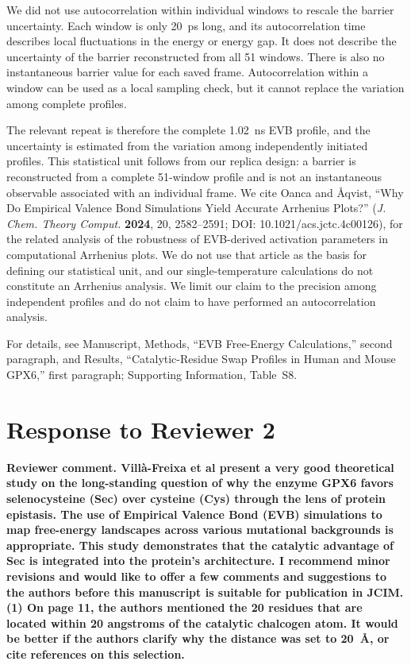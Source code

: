 \documentclass[11pt]{article}
\newcommand{\ReviewerComment}[1]{\par\noindent\textbf{Reviewer comment. #1}\par}
\newcommand{\Location}[1]{\par\noindent For details, see #1\par}
\begin{document}
We did not use autocorrelation within individual windows to rescale the barrier
uncertainty. Each window is only 20~ps long, and its autocorrelation time describes local
fluctuations in the energy or energy gap. It does not describe the uncertainty of the
barrier reconstructed from all 51 windows. There is also no instantaneous barrier value
for each saved frame. Autocorrelation within a window can be used as a local sampling
check, but it cannot replace the variation among complete profiles.

The relevant repeat is therefore the complete 1.02~ns EVB profile, and the uncertainty is
estimated from the variation among independently initiated profiles. This statistical unit
follows from our replica design: a barrier is reconstructed from a complete 51-window
profile and is not an instantaneous observable associated with an individual frame. We
cite Oanca and {\AA}qvist, ``Why Do Empirical Valence Bond Simulations Yield Accurate
Arrhenius Plots?'' (\textit{J. Chem. Theory Comput.} \textbf{2024}, 20, 2582--2591;
DOI: 10.1021/acs.jctc.4c00126), for the related analysis of the robustness of EVB-derived
activation parameters in computational Arrhenius plots. We do not use that article as the
basis for defining our statistical unit, and our single-temperature calculations do not
constitute an Arrhenius analysis. We limit our claim to the precision among independent
profiles and do not claim to have performed an autocorrelation analysis.

\Location{Manuscript, Methods, ``EVB Free-Energy Calculations,'' second paragraph, and
Results, ``Catalytic-Residue Swap Profiles in Human and Mouse GPX6,'' first paragraph;
Supporting Information, Table~S8.}

\newpage
\section*{Response to Reviewer 2}

\ReviewerComment{Vill\`a-Freixa et al present a very good theoretical study on the long-standing question of why the enzyme GPX6 favors selenocysteine (Sec) over cysteine (Cys) through the lens of protein epistasis. The use of Empirical Valence Bond (EVB) simulations to map free-energy landscapes across various mutational backgrounds is appropriate. This study demonstrates that the catalytic advantage of Sec is integrated into the protein's architecture. I recommend minor revisions and would like to offer a few comments and suggestions to the authors before this manuscript is suitable for publication in JCIM.\\
(1) On page 11, the authors mentioned the 20 residues that are located within 20 angstroms of the catalytic chalcogen atom. It would be better if the authors clarify why the distance was set to 20~\AA{}, or cite references on this selection.}
\end{document}
